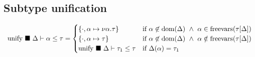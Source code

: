 \documentclass[manuscript]{acmart}
\begin{document}
\subsection{Subtype unification}

\[
  \begin{array}{l @{} l}

    \text{unify } \blacksquare\ \Delta \vdash \alpha \leq \tau	
    &{} =
    \begin{cases}  
      \{ \cdot,\alpha \mapsto \nu\alpha.\tau \}
      & \text{if } 
      \alpha \not\in \text{dom}(\Delta) \ \wedge\
      \alpha \in \text{freevars}(\tau[\Delta])
      \\
      \{ \cdot,\alpha \mapsto \tau \}
      & \text{if } 
      \alpha \not\in \text{dom}(\Delta) \ \wedge\
      \alpha \notin \text{freevars}(\tau[\Delta])
      \\
      \text{unify } \blacksquare\ \Delta \vdash \tau_1 \leq \tau
      &\text{if }
      \Delta(\alpha) = \tau_1
    \end{cases}
    \\


\end{array}\]
\end{document}

